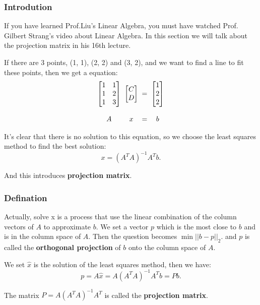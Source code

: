 \documentclass[12pt]{ctexart}
\begin{document}
\subsubsection{\textbf{Introdution}}

If you have learned Prof.Liu's Linear Algebra, you must have watched Prof. Gilbert Strang's
video about Linear Algebra. In this section we will talk about the projection matrix in
his 16th lecture.

If there are 3 points, (1, 1), (2, 2) and (3, 2), and we want to find a line to fit these
points, then we get a equation:
\[
  \begin{array}{c@{\;\;}c@{\;\;}c@{\;\;}c}
    \begin{bmatrix}1 & 1 \\ 1 & 2 \\ 1 & 3\end{bmatrix}
    & \begin{bmatrix}C \\ D\end{bmatrix}
    & = & \begin{bmatrix}1 \\ 2 \\ 2\end{bmatrix} \\\\
    A & x & = & b
  \end{array}
\]

It's clear that there is no solution to this equation, so we choose the least squares method
to find the best solution:
\[
  x = (A^TA)^{-1}A^Tb.
\]

And this introduces \textbf{projection matrix}.

\subsubsection{\textbf{Defination}}

Actually, solve x is a process that use the linear combination of the column vectors of $A$
to approximate $b$. We set a vector $p$ which is the most close to $b$ and is in the
column space of $A$. Then the question becomes $\min ||b-p||_2$. and $p$ is called the
\textbf{orthogonal projection} of $b$ onto the column space of $A$.

We set $\hat{x}$ is the solution of the least squares method, then we have:
\[
  p = A\hat{x} = A(A^TA)^{-1}A^Tb = Pb.
\]

The matrix $P = A(A^TA)^{-1}A^T$ is called the \textbf{projection matrix}.
\end{document}
